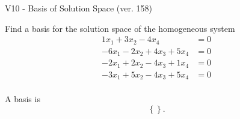 \begin{exercise}
  \begin{exerciseTitle}V10 - Basis of Solution Space (ver. 158)\end{exerciseTitle}
  \begin{exerciseStatement}
    Find a basis for the solution space of the homogeneous system 
\begin{align*}
 1 x_ 1 + 3 x_ 2 -4 x_ 4 &= 0  \\ 
  -6 x_ 1 -2 x_ 2 + 4 x_ 3 + 5 x_ 4 &= 0  \\ 
  -2 x_ 1 + 2 x_ 2 -4 x_ 3 + 1 x_ 4 &= 0  \\ 
  -3 x_ 1 + 5 x_ 2 -4 x_ 3 + 5 x_ 4 &= 0  \\ 
 \end{align*}


 
  \end{exerciseStatement}

  \begin{exerciseAnswer}
   A basis is   
\[\left\{\right\}.\]

  


  \end{exerciseAnswer}
\end{exercise}